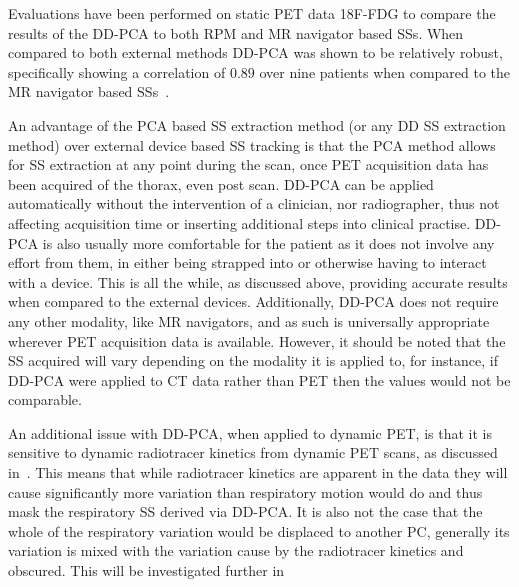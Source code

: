                 Evaluations have been performed on static PET data \gls{18F-FDG} to compare the results of the \gls{DD-PCA} to both \gls{RPM} and \gls{MR} navigator based \glspl{SS}. When compared to both external methods \gls{DD-PCA} was shown to be relatively robust, specifically showing a correlation of $0.89$ over nine patients when compared to the \gls{MR} navigator based \glspl{SS}~\parencite{Thielemans2013ComparisonData, Manber2015PracticalPET/MR}.
                
                An advantage of the \gls{PCA} based \gls{SS} extraction method (or any \gls{DD} \gls{SS} extraction method) over external device based \gls{SS} tracking is that the \gls{PCA} method allows for \gls{SS} extraction at any point during the scan, once \gls{PET} acquisition data has been acquired of the thorax, even post scan. \gls{DD-PCA} can be applied automatically without the intervention of a clinician, nor radiographer, thus not affecting acquisition time or inserting additional steps into clinical practise. \gls{DD-PCA} is also usually more comfortable for the patient as it does not involve any effort from them, in either being strapped into or otherwise having to interact with a device. This is all the while, as discussed above, providing accurate results when compared to the external devices. Additionally, \gls{DD-PCA} does not require any other modality, like \gls{MR} navigators, and as such is universally appropriate wherever \gls{PET} acquisition data is available. However, it should be noted that the \gls{SS} acquired will vary depending on the modality it is applied to, for instance, if \gls{DD-PCA} were applied to \gls{CT} data rather than \gls{PET} then the values would not be comparable.
                
                An additional issue with \gls{DD-PCA}, when applied to dynamic \gls{PET}, is that it is sensitive to dynamic radiotracer kinetics from dynamic \gls{PET} scans, as discussed in~. This means that while radiotracer kinetics are apparent in the data they will cause significantly more variation than respiratory motion would do and thus mask the respiratory \gls{SS} derived via \gls{DD-PCA}. It is also not the case that the whole of the respiratory variation would be displaced to another \gls{PC}, generally its variation is mixed with the variation cause by the radiotracer kinetics and obscured. This will be investigated further in~
        
